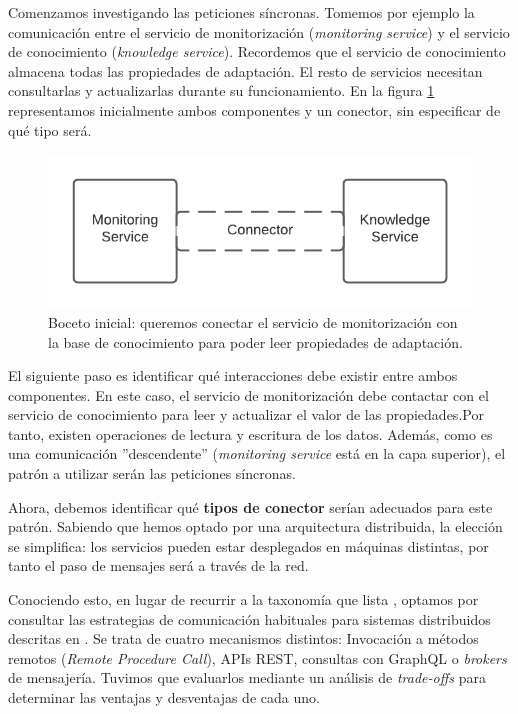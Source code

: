 Comenzamos investigando las peticiones síncronas. Tomemos por ejemplo la comunicación entre el servicio de monitorización (\emph{monitoring service}) y el servicio de conocimiento (\emph{knowledge service}). Recordemos que el servicio de conocimiento almacena todas las propiedades de adaptación. El resto de servicios necesitan consultarlas y actualizarlas durante su funcionamiento. En la figura \ref{fig:monitor-knowledge-initial} representamos inicialmente ambos componentes y un conector, sin especificar de qué tipo será.

\begin{figure}[htb]
  \centering
  \includegraphics{cap_arquitectura/images/Monitor-Knowledge-Initial-Connector}
  \caption{Boceto inicial: queremos conectar el servicio de monitorización con la base de conocimiento para poder leer propiedades de adaptación.}
  \label{fig:monitor-knowledge-initial}
\end{figure}

El siguiente paso es identificar qué interacciones debe existir entre ambos componentes. En este caso, el servicio de monitorización debe contactar con el servicio de conocimiento para leer y actualizar el valor de las propiedades.Por tanto, existen operaciones de lectura y escritura de los datos. Además, como es una comunicación ''descendente'' (\emph{monitoring service} está en la capa superior), el patrón a utilizar serán las peticiones síncronas.

Ahora, debemos identificar qué \textbf{tipos de conector} serían adecuados para este patrón. Sabiendo que hemos optado por una arquitectura distribuida, la elección se simplifica: los servicios pueden estar desplegados en máquinas distintas, por tanto el paso de mensajes será a través de la red.

Conociendo esto, en lugar de recurrir a la taxonomía que lista \cite{mehtaTaxonomySoftwareConnectors2000}, optamos por consultar las estrategias de comunicación habituales para sistemas distribuidos descritas en \cite{newmanBuildingMicroservicesDesigning2021}. Se trata de cuatro mecanismos distintos: Invocación a métodos remotos (\emph{Remote Procedure Call}), APIs REST, consultas con GraphQL o \emph{brokers} de mensajería. Tuvimos que evaluarlos mediante un análisis de \emph{trade-offs} para determinar las ventajas y desventajas de cada uno.


